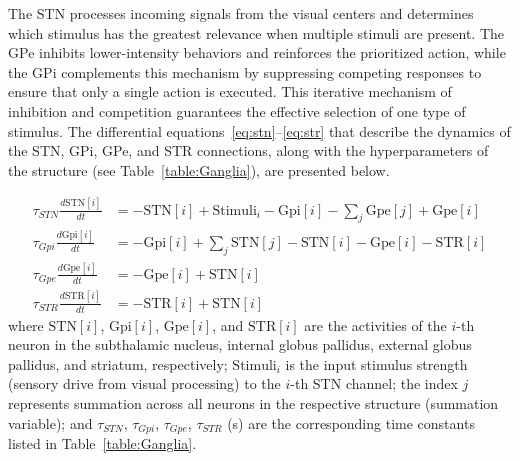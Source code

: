 \documentclass[preprint,12pt]{elsarticle}
\begin{document}
The STN processes incoming signals from the visual centers and determines which stimulus has the greatest relevance when multiple stimuli are present. The GPe inhibits lower-intensity behaviors and reinforces the prioritized action, while the GPi complements this mechanism by suppressing competing responses to ensure that only a single action is executed. This iterative mechanism of inhibition and competition guarantees the effective selection of one type of stimulus. The differential equations~\eqref{eq:stn}–\eqref{eq:str} that describe the dynamics of the STN, GPi, GPe, and STR connections, along with the hyperparameters of the structure (see Table~\ref{table:Ganglia}), are presented below. 

\begin{align}
\tau_{STN}\frac{d \text{STN}[i]}{dt} &= -\text{STN}[i] + \text{Stimuli}_i - \text{Gpi}[i] - \sum_{j} \text{Gpe}[j] + \text{Gpe}[i]\label{eq:stn} \\
\tau_{Gpi}\frac{d \text{Gpi}[i]}{dt} &= - \text{Gpi}[i] + \sum_{j} \text{STN}[j]-\text{STN}[i] - \text{Gpe}[i] - \text{STR}[i]\\
\tau_{Gpe}\frac{d \text{Gpe}[i]}{dt} &= - \text{Gpe}[i] + \text{STN}[i] \\
\tau_{STR}\frac{d \text{STR}[i]}{dt} &= - \text{STR}[i] + \text{STN}[i]
\label{eq:str}
\end{align}
where $\text{STN}[i]$, $\text{Gpi}[i]$, $\text{Gpe}[i]$, and $\text{STR}[i]$ are the activities of the $i$-th neuron in the subthalamic nucleus, internal globus pallidus, external globus pallidus, and striatum, respectively; $\text{Stimuli}_i$ is the input stimulus strength (sensory drive from visual processing) to the $i$-th STN channel; the index $j$ represents summation across all neurons in the respective structure (summation variable); and $\tau_{STN}$, $\tau_{Gpi}$, $\tau_{Gpe}$, $\tau_{STR}$ (s) are the corresponding time constants listed in Table~\ref{table:Ganglia}.
\end{document}
